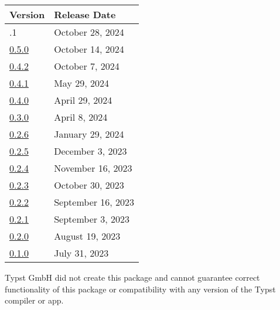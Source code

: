 \begin{longtable}[]{@{}ll@{}}
\toprule\noalign{}
Version & Release Date \\
\midrule\noalign{}
\endhead
\bottomrule\noalign{}
\endlastfoot
0.5.1 & October 28, 2024 \\
\href{https://typst.app/universe/package/glossarium/0.5.0/}{0.5.0} &
October 14, 2024 \\
\href{https://typst.app/universe/package/glossarium/0.4.2/}{0.4.2} &
October 7, 2024 \\
\href{https://typst.app/universe/package/glossarium/0.4.1/}{0.4.1} & May
29, 2024 \\
\href{https://typst.app/universe/package/glossarium/0.4.0/}{0.4.0} &
April 29, 2024 \\
\href{https://typst.app/universe/package/glossarium/0.3.0/}{0.3.0} &
April 8, 2024 \\
\href{https://typst.app/universe/package/glossarium/0.2.6/}{0.2.6} &
January 29, 2024 \\
\href{https://typst.app/universe/package/glossarium/0.2.5/}{0.2.5} &
December 3, 2023 \\
\href{https://typst.app/universe/package/glossarium/0.2.4/}{0.2.4} &
November 16, 2023 \\
\href{https://typst.app/universe/package/glossarium/0.2.3/}{0.2.3} &
October 30, 2023 \\
\href{https://typst.app/universe/package/glossarium/0.2.2/}{0.2.2} &
September 16, 2023 \\
\href{https://typst.app/universe/package/glossarium/0.2.1/}{0.2.1} &
September 3, 2023 \\
\href{https://typst.app/universe/package/glossarium/0.2.0/}{0.2.0} &
August 19, 2023 \\
\href{https://typst.app/universe/package/glossarium/0.1.0/}{0.1.0} &
July 31, 2023 \\
\end{longtable}

Typst GmbH did not create this package and cannot guarantee correct
functionality of this package or compatibility with any version of the
Typst compiler or app.
